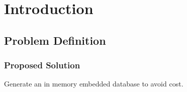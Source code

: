 \chapter{Introduction}




\section{Problem Definition}




\subsection{Proposed Solution}
Generate an in memory embedded database to avoid cost.

